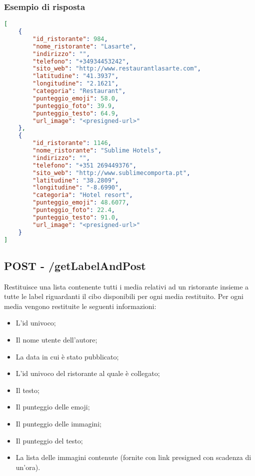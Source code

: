 \subsubsection{Esempio di risposta}
\begin{lstlisting}[language=json]
[
    {
        "id_ristorante": 984,
        "nome_ristorante": "Lasarte",
        "indirizzo": "",
        "telefono": "+34934453242",
        "sito_web": "http://www.restaurantlasarte.com",
        "latitudine": "41.3937",
        "longitudine": "2.1621",
        "categoria": "Restaurant",
        "punteggio_emoji": 58.0,
        "punteggio_foto": 39.9,
        "punteggio_testo": 64.9,
        "url_image": "<presigned-url>"
    },
    {
        "id_ristorante": 1146,
        "nome_ristorante": "Sublime Hotels",
        "indirizzo": "",
        "telefono": "+351 269449376",
        "sito_web": "http://www.sublimecomporta.pt",
        "latitudine": "38.2809",
        "longitudine": "-8.6990",
        "categoria": "Hotel resort",
        "punteggio_emoji": 48.6077,
        "punteggio_foto": 22.4,
        "punteggio_testo": 91.0,
        "url_image": "<presigned-url>"
    }
]
\end{lstlisting}

\pagebreak








\subsection{POST - /getLabelAndPost} 
Restituisce una lista contenente tutti i media relativi ad un ristorante insieme a tutte le label riguardanti il cibo disponibili per ogni media restituito. Per ogni media vengono restituite le seguenti informazioni:
\begin{itemize}
	\item L'id univoco;
    \item Il nome utente dell'autore;
    \item La data in cui è stato pubblicato;
    \item L'id univoco del ristorante al quale è collegato;
    \item Il testo;
    \item Il punteggio delle emoji;
    \item Il punteggio delle immagini;
    \item Il punteggio del testo;
	\item La lista delle immagini contenute (fornite con link presigned con scadenza di un'ora).
\end{itemize}


